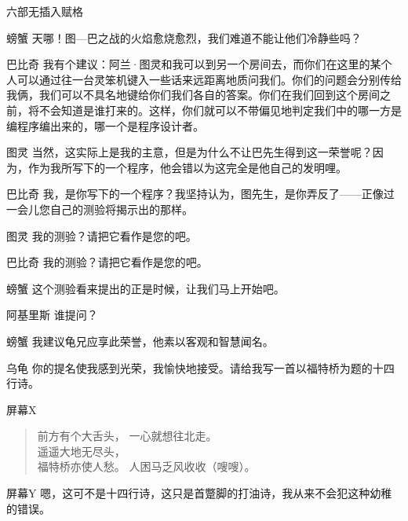 \begin{dialog}{六部无插入赋格}
\begin{dialogue}
\item[螃蟹]天哪！图—巴之战的火焰愈烧愈烈，我们难道不能让他们冷静些吗？

\item[巴比奇]我有个建议：阿兰·图灵和我可以到另一个房间去，而你们在这里的某个人可以通过往一台灵笨机键入一些话来远距离地质问我们。你们的问题会分别传给我俩，我们可以不具名地键给你们我们各自的答案。你们在我们回到这个房间之前，将不会知道是谁打来的。这样，你们就可以不带偏见地判定我们中的哪一方是编程序编出来的，哪一个是程序设计者。

\item[图灵]当然，这实际上是我的主意，但是为什么不让巴先生得到这一荣誉呢？因为，作为我所写下的一个程序，他会错以为这完全是他自己的发明哩。

\item[巴比奇]我，是你写下的一个程序？我坚持认为，图先生，是你弄反了——正像过一会儿您自己的测验将揭示出的那样。

\item[图灵]我的测验？请把它看作是您的吧。

\item[巴比奇]我的测验？请把它看作是您的吧。

\item[螃蟹]这个测验看来提出的正是时候，让我们马上开始吧。


\item[阿基里斯]谁提问？

\item[螃蟹]我建议龟兄应享此荣誉，他素以客观和智慧闻名。

\item[乌龟]你的提名使我感到光荣，我愉快地接受。请给我写一首以福特桥为题的十四行诗。


\item[屏幕X]
\begin{verse}
前方有个大舌头，
一心就想往北走。\\[1]
遥遥大地无尽头，\\[1]
福特桥亦使人愁。
人困马乏风收收（嗖嗖）。
\end{verse}
\item[屏幕Y]嗯，这可不是十四行诗，这只是首蹩脚的打油诗，我从来不会犯这种幼稚的错误。


\end{dialogue}
\end{dialog}
